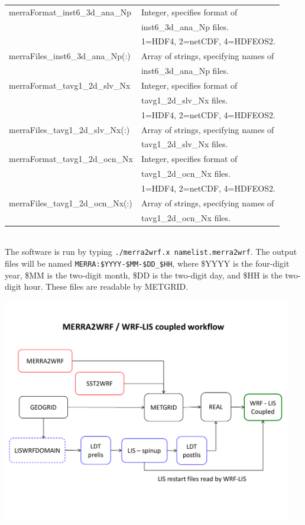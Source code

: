 \begin{tabular}{|l|l|}
merraFormat\_inst6\_3d\_ana\_Np & Integer, specifies format of\\
 & inst6\_3d\_ana\_Np files. \\
 & 1=HDF4, 2=netCDF, 4=HDFEOS2. \\ \hline
merraFiles\_inst6\_3d\_ana\_Np(:) & Array of strings, specifying names of\\
 & inst6\_3d\_ana\_Np files. \\ \hline
merraFormat\_tavg1\_2d\_slv\_Nx & Integer, specifies format of \\
 & tavg1\_2d\_slv\_Nx files. \\
 & 1=HDF4, 2=netCDF, 4=HDFEOS2. \\ \hline
merraFiles\_tavg1\_2d\_slv\_Nx(:) & Array of strings, specifying names of\\
 & tavg1\_2d\_slv\_Nx files. \\ \hline
merraFormat\_tavg1\_2d\_ocn\_Nx & Integer, specifies format of \\
 & tavg1\_2d\_ocn\_Nx files. \\
 & 1=HDF4, 2=netCDF, 4=HDFEOS2. \\ \hline
merraFiles\_tavg1\_2d\_ocn\_Nx(:) & Array of strings, specifying names of\\
 & tavg1\_2d\_ocn\_Nx files. \\ \hline
\end{tabular}\\

The software is run by typing \texttt{./merra2wrf.x namelist.merra2wrf}. The
output files will be named \texttt{MERRA:\$YYYY-\$MM-\$DD\_\$HH}, where \$YYYY
is the four-digit year, \$MM is the two-digit month, \$DD is the two-digit day,
and \$HH is the two-digit hour. These files are readable by METGRID.  

\centerline{\includegraphics[width=5in]{MERRA_workflow}}

